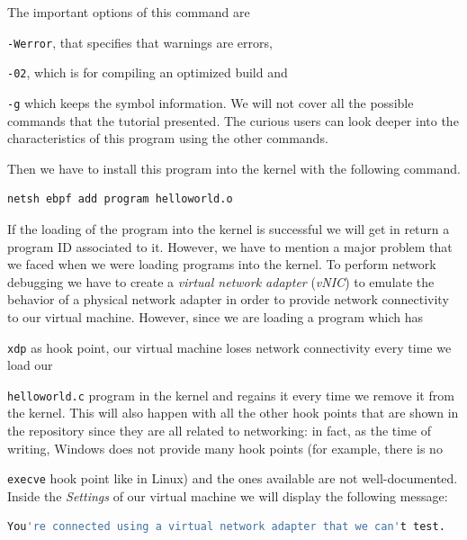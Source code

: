 The important options of this command are \raggedright\colorbox{backcolour}{\lstinline[style=commandline, language=bash]|-Werror|}, that specifies that warnings are errors, \raggedright\colorbox{backcolour}{\lstinline[style=commandline, language=bash]|-02|}, which is for compiling an optimized build and \raggedright\colorbox{backcolour}{\lstinline[style=commandline, language=bash]|-g|} which keeps the symbol information.
We will not cover all the possible commands that the tutorial presented.
The curious users can look deeper into the characteristics of this program using the other commands.

Then we have to install this program into the kernel with the following command.

\begin{lstlisting}[style=commandline, language=bash, caption={``Hello world!''-like program installation command in ebpf-for-windows.}]
	netsh ebpf add program helloworld.o
\end{lstlisting}

If the loading of the program into the kernel is successful we will get in return a program ID associated to it.
However, we have to mention a major problem that we faced when we were loading programs into the kernel.
To perform network debugging we have to create a \textit{virtual network adapter} (\textit{vNIC}) to emulate the behavior of a physical network adapter in order to provide network connectivity to our virtual machine.
However, since we are loading a program which has \raggedright\colorbox{backcolour}{\lstinline[style=commandline, language=bash]|xdp|} as hook point, our virtual machine loses network connectivity every time we load our \raggedright\colorbox{backcolour}{\lstinline[style=commandline, language=bash]|helloworld.c|} program in the kernel and regains it every time we remove it from the kernel.
This will also happen with all the other hook points that are shown in the repository since they are all related to networking: in fact, as the time of writing, Windows does not provide many hook points (for example, there is no \raggedright\colorbox{backcolour}{\lstinline[style=commandline, language=bash]|execve|} hook point like in Linux) and the ones available are not well-documented.
Inside the \textit{Settings} of our virtual machine we will display the following message:

\begin{lstlisting}[style=commandline, language=bash, caption={Network adapter problem message on the virtual machine.}]
	You're connected using a virtual network adapter that we can't test.
\end{lstlisting}

